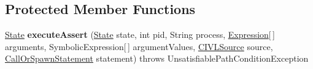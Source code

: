 \subsection*{Protected Member Functions}
\begin{DoxyCompactItemize}
\item 
\hypertarget{classedu_1_1udel_1_1cis_1_1vsl_1_1civl_1_1library_1_1common_1_1BaseLibraryExecutor_ac189728eafe8ee0647d6799bd184406d}{}\hyperlink{interfaceedu_1_1udel_1_1cis_1_1vsl_1_1civl_1_1state_1_1IF_1_1State}{State} {\bfseries execute\+Assert} (\hyperlink{interfaceedu_1_1udel_1_1cis_1_1vsl_1_1civl_1_1state_1_1IF_1_1State}{State} state, int pid, String process, \hyperlink{interfaceedu_1_1udel_1_1cis_1_1vsl_1_1civl_1_1model_1_1IF_1_1expression_1_1Expression}{Expression}\mbox{[}$\,$\mbox{]} arguments, Symbolic\+Expression\mbox{[}$\,$\mbox{]} argument\+Values, \hyperlink{interfaceedu_1_1udel_1_1cis_1_1vsl_1_1civl_1_1model_1_1IF_1_1CIVLSource}{C\+I\+V\+L\+Source} source, \hyperlink{interfaceedu_1_1udel_1_1cis_1_1vsl_1_1civl_1_1model_1_1IF_1_1statement_1_1CallOrSpawnStatement}{Call\+Or\+Spawn\+Statement} statement)  throws Unsatisfiable\+Path\+Condition\+Exception \label{classedu_1_1udel_1_1cis_1_1vsl_1_1civl_1_1library_1_1common_1_1BaseLibraryExecutor_ac189728eafe8ee0647d6799bd184406d}


\end{DoxyCompactItemize}

